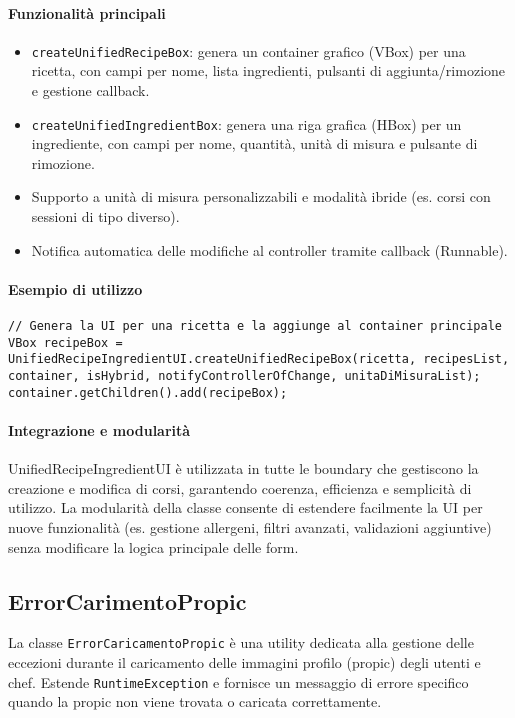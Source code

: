 \paragraph{Funzionalità principali}
\begin{itemize}
    \item \texttt{createUnifiedRecipeBox}: genera un container grafico (VBox) per una ricetta, con campi per nome, lista ingredienti, pulsanti di aggiunta/rimozione e gestione callback.
    \item \texttt{createUnifiedIngredientBox}: genera una riga grafica (HBox) per un ingrediente, con campi per nome, quantità, unità di misura e pulsante di rimozione.
    \item Supporto a unità di misura personalizzabili e modalità ibride (es. corsi con sessioni di tipo diverso).
    \item Notifica automatica delle modifiche al controller tramite callback (Runnable).
\end{itemize}

\paragraph{Esempio di utilizzo}
\begin{verbatim}
// Genera la UI per una ricetta e la aggiunge al container principale
VBox recipeBox = UnifiedRecipeIngredientUI.createUnifiedRecipeBox(ricetta, recipesList, container, isHybrid, notifyControllerOfChange, unitaDiMisuraList);
container.getChildren().add(recipeBox);
\end{verbatim}

\paragraph{Integrazione e modularità}
UnifiedRecipeIngredientUI è utilizzata in tutte le boundary che gestiscono la creazione e modifica di corsi, garantendo coerenza, efficienza e semplicità di utilizzo. La modularità della classe consente di estendere facilmente la UI per nuove funzionalità (es. gestione allergeni, filtri avanzati, validazioni aggiuntive) senza modificare la logica principale delle form.

\subsection{ErrorCarimentoPropic}
La classe \texttt{ErrorCaricamentoPropic} è una utility dedicata alla gestione delle eccezioni durante il caricamento delle immagini profilo (propic) degli utenti e chef. Estende \texttt{RuntimeException} e fornisce un messaggio di errore specifico quando la propic non viene trovata o caricata correttamente.

